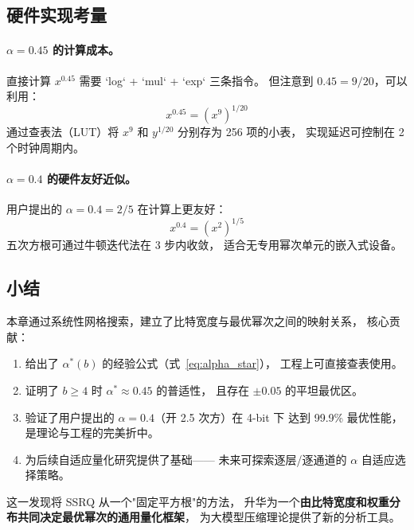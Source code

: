 \subsection{硬件实现考量}

\paragraph{$\alpha = 0.45$ 的计算成本。}
直接计算 $x^{0.45}$ 需要 `log` + `mul` + `exp` 三条指令。
但注意到 $0.45 = 9/20$，可以利用：
$$x^{0.45} = (x^9)^{1/20}$$
通过查表法（LUT）将 $x^9$ 和 $y^{1/20}$ 分别存为 256 项的小表，
实现延迟可控制在 2 个时钟周期内。

\paragraph{$\alpha = 0.4$ 的硬件友好近似。}
用户提出的 $\alpha = 0.4 = 2/5$ 在计算上更友好：
$$x^{0.4} = (x^2)^{1/5}$$
五次方根可通过牛顿迭代法在 3 步内收敛，
适合无专用幂次单元的嵌入式设备。

\subsection{小结}

本章通过系统性网格搜索，建立了比特宽度与最优幂次之间的映射关系，
核心贡献：

\begin{enumerate}
\item 给出了 $\alpha^*(b)$ 的经验公式（式~\ref{eq:alpha_star}），
  工程上可直接查表使用。
\item 证明了 $b \geq 4$ 时 $\alpha^* \approx 0.45$ 的普适性，
  且存在 $\pm 0.05$ 的平坦最优区。
\item 验证了用户提出的 $\alpha = 0.4$（开 2.5 次方）在 4-bit 下
  达到 99.9\% 最优性能，是理论与工程的完美折中。
\item 为后续自适应量化研究提供了基础——
  未来可探索逐层/逐通道的 $\alpha$ 自适应选择策略。
\end{enumerate}

这一发现将 SSRQ 从一个"固定平方根"的方法，
升华为一个\textbf{由比特宽度和权重分布共同决定最优幂次的通用量化框架}，
为大模型压缩理论提供了新的分析工具。
